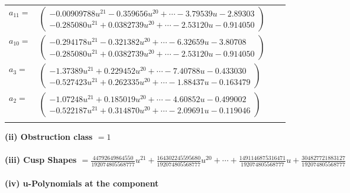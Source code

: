 \documentclass[1p]{elsarticle_modified}
\theoremstyle{definition}
\begin{document}
\begin{tabular}{m{7pt} m{180pt} m{7pt} m{180pt} }
\flushright $a_{11}=$&$\begin{pmatrix}-0.00909788 u^{21}-0.359656 u^{20}+\cdots-3.79539 u-2.89303\\-0.285080 u^{21}+0.0382739 u^{20}+\cdots-2.53120 u-0.914050\end{pmatrix}$ \\
\flushright $a_{10}=$&$\begin{pmatrix}-0.294178 u^{21}-0.321382 u^{20}+\cdots-6.32659 u-3.80708\\-0.285080 u^{21}+0.0382739 u^{20}+\cdots-2.53120 u-0.914050\end{pmatrix}$ \\
\flushright $a_{3}=$&$\begin{pmatrix}-1.37389 u^{21}+0.229452 u^{20}+\cdots-7.40788 u-0.433030\\-0.527423 u^{21}+0.262335 u^{20}+\cdots-1.88437 u-0.163479\end{pmatrix}$ \\
\flushright $a_{2}=$&$\begin{pmatrix}-1.07248 u^{21}+0.185019 u^{20}+\cdots-4.60852 u-0.499002\\-0.522187 u^{21}+0.314870 u^{20}+\cdots-2.09691 u-0.119046\end{pmatrix}$\\&\end{tabular}
\flushleft \textbf{(ii) Obstruction class $= 1$}\\~\\
\flushleft \textbf{(iii) Cusp Shapes $= \frac{44792649864550}{192074805568777} u^{21}+\frac{164302245595680}{192074805568777} u^{20}+\cdots+\frac{1491146875316471}{192074805568777} u+\frac{304827721883127}{192074805568777}$}\\~\\
\newpage\renewcommand{\arraystretch}{1}
\flushleft \textbf{(iv) u-Polynomials at the component}\newline \\
\end{document}
